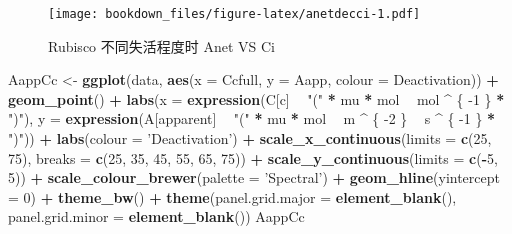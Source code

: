 \documentclass[
]{krantz}
\makeatletter
\newenvironment{Shaded}{\begin{snugshade}}{\end{snugshade}}
\newcommand{\DataTypeTok}[1]{\textcolor[rgb]{0.13,0.29,0.53}{#1}}
\newcommand{\DecValTok}[1]{\textcolor[rgb]{0.00,0.00,0.81}{#1}}
\newcommand{\KeywordTok}[1]{\textcolor[rgb]{0.13,0.29,0.53}{\textbf{#1}}}
\newcommand{\NormalTok}[1]{#1}
\newcommand{\OperatorTok}[1]{\textcolor[rgb]{0.81,0.36,0.00}{\textbf{#1}}}
\newcommand{\StringTok}[1]{\textcolor[rgb]{0.31,0.60,0.02}{#1}}
\newenvironment{kframe}{%
\medskip{}
\setlength{\fboxsep}{.8em}
 \def\at@end@of@kframe{}%
 \ifinner\ifhmode%
  \def\at@end@of@kframe{\end{minipage}}%
  \begin{minipage}{\columnwidth}%
 \fi\fi%
 \def\FrameCommand##1{\hskip\@totalleftmargin \hskip-\fboxsep
 \colorbox{shadecolor}{##1}\hskip-\fboxsep
     \hskip-\linewidth \hskip-\@totalleftmargin \hskip\columnwidth}%
 \MakeFramed {\advance\hsize-\width
   \@totalleftmargin\z@ \linewidth\hsize
   \@setminipage}}%
 {\par\unskip\endMakeFramed%
 \at@end@of@kframe}
\renewenvironment{Shaded}{\begin{kframe}}{\end{kframe}}
\makeatother
\begin{document}
\begin{figure}
\centering
\texttt{[image: bookdown\_files/figure-latex/anetdecci-1.pdf]}
\caption{\label{fig:anetdecci}Rubisco 不同失活程度时 Anet VS Ci}
\end{figure}

\begin{Shaded}
\begin{Highlighting}[]
\NormalTok{AappCc <-}
\StringTok{  }\KeywordTok{ggplot}\NormalTok{(data, }\KeywordTok{aes}\NormalTok{(}\DataTypeTok{x =}\NormalTok{ Ccfull, }\DataTypeTok{y =}\NormalTok{ Aapp, }\DataTypeTok{colour =}\NormalTok{ Deactivation)) }\OperatorTok{+}
\StringTok{  }\KeywordTok{geom_point}\NormalTok{() }\OperatorTok{+}
\StringTok{  }\KeywordTok{labs}\NormalTok{(}\DataTypeTok{x =} \KeywordTok{expression}\NormalTok{(C[c] }\OperatorTok{~}\StringTok{ "("} \OperatorTok{*}\StringTok{ }\NormalTok{mu }\OperatorTok{*}\StringTok{ }\NormalTok{mol }\OperatorTok{~}\StringTok{ }\NormalTok{mol }\OperatorTok{^}\StringTok{ }\NormalTok{\{}
    \DecValTok{-1}
\NormalTok{  \} }\OperatorTok{*}\StringTok{ ")"}\NormalTok{),}
  \DataTypeTok{y =} \KeywordTok{expression}\NormalTok{(A[apparent] }\OperatorTok{~}\StringTok{ "("} \OperatorTok{*}\StringTok{ }\NormalTok{mu }\OperatorTok{*}\StringTok{ }\NormalTok{mol }\OperatorTok{~}\StringTok{ }\NormalTok{m }\OperatorTok{^}\StringTok{ }\NormalTok{\{}
    \DecValTok{-2}
\NormalTok{  \} }\OperatorTok{~}\StringTok{ }\NormalTok{s }\OperatorTok{^}\StringTok{ }\NormalTok{\{}
    \DecValTok{-1}
\NormalTok{  \} }\OperatorTok{*}\StringTok{ ")"}\NormalTok{)) }\OperatorTok{+}
\StringTok{  }\KeywordTok{labs}\NormalTok{(}\DataTypeTok{colour =} \StringTok{'Deactivation'}\NormalTok{) }\OperatorTok{+}
\StringTok{  }\KeywordTok{scale_x_continuous}\NormalTok{(}\DataTypeTok{limits =} \KeywordTok{c}\NormalTok{(}\DecValTok{25}\NormalTok{, }\DecValTok{75}\NormalTok{),}
                     \DataTypeTok{breaks =} \KeywordTok{c}\NormalTok{(}\DecValTok{25}\NormalTok{, }\DecValTok{35}\NormalTok{, }\DecValTok{45}\NormalTok{, }\DecValTok{55}\NormalTok{, }\DecValTok{65}\NormalTok{, }\DecValTok{75}\NormalTok{)) }\OperatorTok{+}
\StringTok{  }\KeywordTok{scale_y_continuous}\NormalTok{(}\DataTypeTok{limits =} \KeywordTok{c}\NormalTok{(}\OperatorTok{-}\DecValTok{5}\NormalTok{, }\DecValTok{5}\NormalTok{)) }\OperatorTok{+}
\StringTok{  }\KeywordTok{scale_colour_brewer}\NormalTok{(}\DataTypeTok{palette =} \StringTok{'Spectral'}\NormalTok{) }\OperatorTok{+}
\StringTok{  }\KeywordTok{geom_hline}\NormalTok{(}\DataTypeTok{yintercept =} \DecValTok{0}\NormalTok{) }\OperatorTok{+}
\StringTok{  }\KeywordTok{theme_bw}\NormalTok{() }\OperatorTok{+}
\StringTok{  }\KeywordTok{theme}\NormalTok{(}\DataTypeTok{panel.grid.major =} \KeywordTok{element_blank}\NormalTok{(),}
        \DataTypeTok{panel.grid.minor =} \KeywordTok{element_blank}\NormalTok{())}
\NormalTok{AappCc}
\end{Highlighting}
\end{Shaded}
\end{document}
